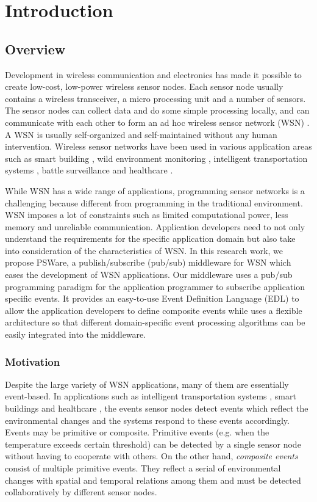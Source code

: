 \chapter{Introduction}
\section{Overview}
\label{sec:introduction}
Development in wireless communication and electronics has made it possible to create low-cost, low-power wireless sensor nodes. Each sensor node usually contains a wireless transceiver, a micro processing unit and a number of sensors. The sensor nodes can collect data and do some simple processing locally, and can communicate with each other to form an ad hoc wireless sensor network (WSN) \cite{aky:survey}. A WSN is usually self-organized and self-maintained without any human intervention. Wireless sensor networks have been used in various application areas such as smart building \cite{lynch:shm}, wild environment monitoring \cite{wsnhabitat}, intelligent transportation systems \cite{klein:its}, battle surveillance \cite{wsntracking} and healthcare \cite{lo:ban}. 

While WSN has a wide range of applications, programming sensor networks is a challenging because different from programming in the traditional environment. WSN imposes a lot of constraints such as limited computational power, less memory and unreliable communication. Application developers need to not only understand the requirements for the specific application domain but also take into consideration of the characteristics of WSN. In this research work, we propose PSWare, a publish/subscribe (pub/sub) middleware for WSN which eases the development of WSN applications. Our middleware uses a pub/sub programming paradigm for the application programmer to subscribe application specific events. It provides an easy-to-use Event Definition Language (EDL) to allow the application developers to define composite events while uses a flexible architecture so that different domain-specific event processing algorithms can be easily integrated into the middleware.

\subsection{Motivation}
Despite the large variety of WSN applications, many of them are essentially event-based. In applications such as intelligent transportation systems \cite{klein:its}, smart buildings \cite{lynch:shm} and healthcare \cite{lo:ban}, the events sensor nodes detect events which reflect the environmental changes and the systems respond to these events accordingly. Events may be primitive or composite. Primitive events (e.g. when the temperature exceeds certain threshold) can be detected by a single sensor node without having to cooperate with others. On the other hand, \emph{composite events} consist of multiple primitive events. They reflect a serial of environmental changes with spatial and temporal relations among them and must be detected collaboratively by different sensor nodes.

